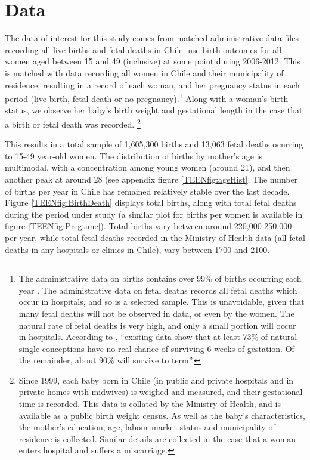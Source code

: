 \section{Data}
\label{TEENscn:Data}
The data of interest for this study comes from matched administrative data files 
recording all live births and fetal deaths in Chile.  \Person use birth outcomes 
for all women aged between 15 and 49 (inclusive) at some point during 2006-2012.  
This is matched with data recording all women in Chile and their municipality of
residence, resulting in a record of each woman, and her pregnancy status in each 
period (live birth, fetal death or no pregnancy).\footnote{The administrative
data on births contains over 99\% of births occurring each year 
\citep{Bharadwajetal2013}.  The administrative data on fetal deaths records all
fetal deaths which occur in hospitals, and so is a selected sample.  This is 
unavoidable, given that many fetal deaths will not be observed in data, or even
by the women.  The natural rate of fetal deaths is very high, and only a small
portion will occur in hospitals.  According to \citet{Blokage1990}, ``existing 
data show that at least 73\% of natural single conceptions have no real chance 
of surviving 6 weeks of gestation. Of the remainder, about 90\% will survive to 
term''.}  Along with a woman's birth status, we observe her baby's birth weight 
and gestational length in the case that a birth or fetal death was recorded.%
\footnote{Since 1999, each baby born in Chile (in public and private hospitals 
and in private homes with midwives) is weighed and measured, and their 
gestational time is recorded.  This data is collated by the Ministry of Health, 
and is available as a public birth weight census.  As well as the baby's 
characteristics, the mother's education, age, labour market status and 
municipality of residence is collected.  Similar details are collected in the 
case that a woman enters hospital and suffers a miscarriage.}

This results in a total sample of 1,605,300 births and 13,063 fetal deaths 
ocurring to 15-49 year-old women.  The distribution of births by mother's age
is multimodal, with a concentration among young women (around 21), and then
another peak at around 28 (see appendix figure \ref{TEENfig:ageHist}. The number 
of births per year in Chile has remained relatively stable over the last decade. 
Figure \ref{TEENfig:BirthDeath} displays total births, along with total fetal 
deaths during the period under study (a similar plot for births per women is 
available in figure \ref{TEENfig:Pregtime}).  Total births vary between around 
220,000-250,000 per year, while total fetal deaths recorded in the Ministry of 
Health data (all fetal deaths in any hospitals or clinics in Chile), vary between 
1700 and 2100.

